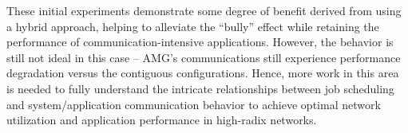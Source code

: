These initial experiments demonstrate some degree of benefit derived from using a hybrid approach, helping to alleviate the ``bully'' effect while retaining the performance of communication-intensive applications. However, the behavior is still not ideal in this case -- AMG's communications still experience performance degradation versus the contiguous configurations. Hence, more work in this area is needed to fully understand the intricate relationships between job scheduling and system/application communication behavior to achieve optimal network utilization and application performance in high-radix networks.
